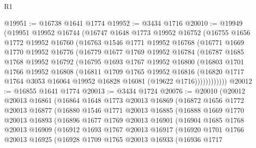 \begin{lexlean}{R1}
\begin{coremodule}
@19951 := @16738 @1641 @1774
@19952 := @3434 @1716
@20010 := @19949
    (@19951
      @19952
      @16744
      (@16747
        @1648
        @1773
        @19952
        @16752
        (@16755
          @1656
          @1772
          @19952
          @16760
          (@16763
            @1546
            @1771
            @19952
            @16768
            (@16771
              @1669
              @1770
              @19952
              @16776
              (@16779
                @1677
                @1769
                @19952
                @16784
                (@16787
                  @1685
                  @1768
                  @19952
                  @16792
                  (@16795
                    @1693
                    @1767
                    @19952
                    @16800
                    (@16803
                      @1701
                      @1766
                      @19952
                      @16808
                      (@16811
                        @1709
                        @1765
                        @19952
                        @16816
                        (@16820
                          @1717
                          @1764
                          @3053
                          @16064
                          @19952
                          @16828
                          @16081
                          (@19622 @1716))))))))))))
@20012 := @16855 @1641 @1774
@20013 := @3434 @1724
@20076 := @20010
    (@20012
      @20013
      @16861
      (@16864
        @1648
        @1773
        @20013
        @16869
        (@16872
          @1656
          @1772
          @20013
          @16877
          (@16880
            @1546
            @1771
            @20013
            @16885
            (@16888
              @1669
              @1770
              @20013
              @16893
              (@16896
                @1677
                @1769
                @20013
                @16901
                (@16904
                  @1685
                  @1768
                  @20013
                  @16909
                  (@16912
                    @1693
                    @1767
                    @20013
                    @16917
                    (@16920
                      @1701
                      @1766
                      @20013
                      @16925
                      (@16928
                        @1709
                        @1765
                        @20013
                        @16933
                        (@16936
                          @1717

\end{coremodule}
\end{lexlean}
